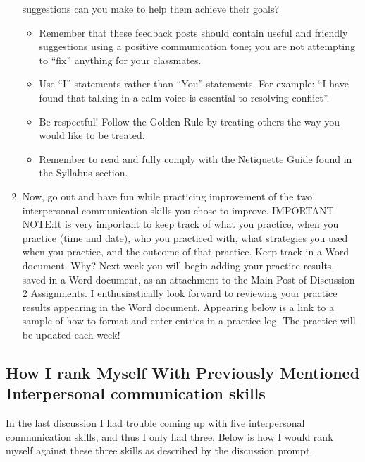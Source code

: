 \documentclass[stu,12pt]{apa7}
\begin{document}
\begin{enumerate}
          suggestions can you make to help them achieve their goals?
          \begin{itemize}
            \item Remember that these feedback posts should contain useful and
              friendly suggestions using a positive communication tone; you are
              not attempting to “fix” anything for your classmates.
            \item Use “I” statements rather than “You” statements. For example:
              ``I have found that talking in a calm voice is essential to
              resolving conflict''.
            \item Be respectful! Follow the Golden Rule by treating others the
              way you would like to be treated.
            \item Remember to read and fully comply with the Netiquette Guide
              found in the Syllabus section.
          \end{itemize}
        \item Now, go out and have fun while practicing improvement of the two
          interpersonal communication skills you chose to improve. IMPORTANT
          NOTE:\@ It is very important to keep track of what you practice, when
          you practice (time and date), who you practiced with, what strategies
          you used when you practice, and the outcome of that practice. Keep
          track in a Word document. Why? Next week you will begin adding your
          practice results, saved in a Word document, as an attachment to the
          Main Post of Discussion 2 Assignments. I enthusiastically look forward
          to reviewing your practice results appearing in the Word document.
          Appearing below is a link to a sample of how to format and enter
          entries in a practice log. The practice will be updated each week!
      \end{enumerate}

    \newpage
    \subsection{How I rank Myself With Previously Mentioned Interpersonal %
      communication skills}
      In the last discussion I had trouble coming up with five interpersonal
        communication skills, and thus I only had three. Below is how I would
        rank myself against these three skills as described by the discussion
        prompt.
\end{document}
